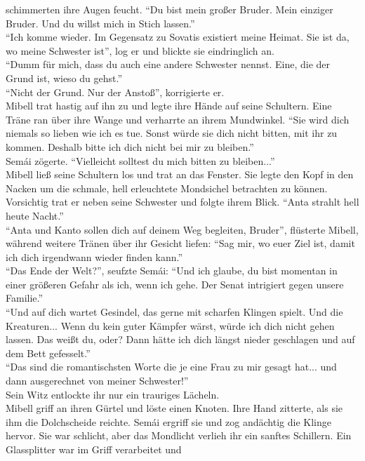 schimmerten ihre Augen feucht. ``Du bist mein großer Bruder. Mein einziger Bruder. Und du willst 
mich in Stich lassen.''\\
``Ich komme wieder. Im Gegensatz zu Sovatis existiert meine Heimat. Sie ist da, wo meine Schwester 
ist'', log er und blickte sie eindringlich an.\\
``Dumm für mich, dass du auch eine andere Schwester nennst. Eine, die der Grund ist, wieso du 
gehst.''\\
``Nicht der Grund. Nur der Anstoß'', korrigierte er.\\
Mibell trat hastig auf ihn zu und legte ihre Hände auf seine Schultern. Eine Träne ran über ihre 
Wange und verharrte an ihrem Mundwinkel. ``Sie wird dich niemals so lieben wie ich es tue. Sonst 
würde sie dich nicht bitten, mit ihr zu kommen. Deshalb bitte ich dich nicht bei mir zu bleiben.''\\
Semái zögerte. ``Vielleicht solltest du mich bitten zu bleiben...''\\
Mibell ließ seine Schultern los und trat an das Fenster. Sie legte den Kopf in den Nacken um die 
schmale, hell erleuchtete Mondsichel betrachten zu können. Vorsichtig trat er neben seine Schwester 
und folgte ihrem Blick. ``Anta strahlt hell heute Nacht.''\\
``Anta und Kanto sollen dich auf deinem Weg begleiten, Bruder'', flüsterte Mibell, während weitere 
Tränen über ihr Gesicht liefen: ``Sag mir, wo euer Ziel ist, damit ich dich irgendwann wieder 
finden kann.''\\
``Das Ende der Welt?'', seufzte Semái: ``Und ich glaube, du bist momentan in einer größeren Gefahr 
als ich, wenn ich gehe. Der Senat intrigiert gegen unsere Familie.''\\
``Und auf dich wartet Gesindel, das gerne mit scharfen Klingen spielt. Und die Kreaturen... Wenn du 
kein guter Kämpfer wärst, würde ich dich nicht gehen lassen. Das weißt du, oder? Dann hätte ich dich 
längst nieder geschlagen und auf dem Bett gefesselt.''\\
``Das sind die romantischsten Worte die je eine Frau zu mir gesagt hat... und dann ausgerechnet von 
meiner Schwester!''\\
Sein Witz entlockte ihr nur ein trauriges Lächeln. \\
Mibell griff an ihren Gürtel und löste einen Knoten. Ihre Hand zitterte, als sie ihm die 
Dolchscheide reichte. Semái ergriff sie und zog andächtig die Klinge hervor. Sie war schlicht, aber 
das Mondlicht verlieh ihr ein sanftes Schillern. Ein Glassplitter war im Griff verarbeitet und 
